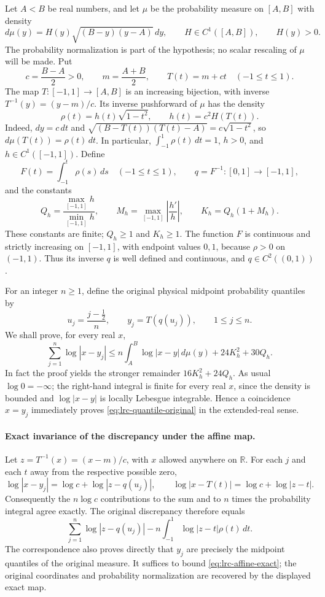 \documentclass[11pt,a4paper]{article}
\begin{document}
Let $A<B$ be real numbers, and let $\mu$ be the probability measure on
$[A,B]$ with density
\[
 d\mu(y)=H(y)\sqrt{(B-y)(y-A)}\,dy,
 \qquad H\in C^1([A,B]),\qquad H(y)>0.
\]
The probability normalization is part of the hypothesis; no scalar
rescaling of $\mu$ will be made. Put
\[
 c=\frac{B-A}{2}>0,\qquad m=\frac{A+B}{2},\qquad
 T(t)=m+ct\quad(-1\leq t\leq1).
\]
The map $T:[-1,1]\longrightarrow[A,B]$ is an increasing bijection,
with inverse $T^{-1}(y)=(y-m)/c$. Its inverse pushforward of $\mu$ has
the density
\[
 \rho(t)=h(t)\sqrt{1-t^2},\qquad h(t)=c^2H(T(t)).
\]
Indeed, $dy=c\,dt$ and
$\sqrt{(B-T(t))(T(t)-A)}=c\sqrt{1-t^2}$, so
$d\mu(T(t))=\rho(t)\,dt$. In particular,
$\int_{-1}^1\rho(t)\,dt=1$, $h>0$, and $h\in C^1([-1,1])$.
Define
\[
 F(t)=\int_{-1}^t\rho(s)\,ds\quad(-1\leq t\leq1),\qquad
 q=F^{-1}:[0,1]\longrightarrow[-1,1],
\]
and the constants
\[
 Q_h=\frac{\max_{[-1,1]}h}{\min_{[-1,1]}h},\qquad
 M_h=\max_{[-1,1]}\left|\frac{h'}h\right|,\qquad
 K_h=Q_h(1+M_h).
\]
These constants are finite; $Q_h\geq1$ and $K_h\geq1$. The function
$F$ is continuous and strictly increasing on $[-1,1]$, with endpoint
values $0,1$, because $\rho>0$ on $(-1,1)$. Thus its inverse $q$ is
well defined and continuous, and $q\in C^2((0,1))$.

For an integer $n\geq1$, define the original physical midpoint
probability quantiles by
\[
 u_j=\frac{j-\tfrac12}{n},\qquad y_j=T(q(u_j)),
 \qquad 1\leq j\leq n.
\]
We shall prove, for every real $x$,
\begin{equation}\label{eq:lrc-quantile-original}
 \sum_{j=1}^n\log|x-y_j|
 \leq n\int_A^B\log|x-y|\,d\mu(y)
       +24K_h^2+30Q_h.
\end{equation}
In fact the proof yields the stronger remainder $16K_h^2+24Q_h$.
As usual $\log0=-\infty$; the right-hand integral is finite for every
real $x$, since the density is bounded and $\log|x-y|$ is locally
Lebesgue integrable. Hence a coincidence $x=y_j$ immediately proves
\eqref{eq:lrc-quantile-original} in the extended-real sense.

\paragraph{Exact invariance of the discrepancy under the affine map.}
Let $z=T^{-1}(x)=(x-m)/c$, with $x$ allowed anywhere on $\mathbb R$.
For each $j$ and each $t$ away from the respective possible zero,
\[
 \log|x-y_j|=\log c+\log|z-q(u_j)|,
 \qquad
 \log|x-T(t)|=\log c+\log|z-t|.
\]
Consequently the $n\log c$ contributions to the sum and to $n$ times
the probability integral agree exactly. The original discrepancy
therefore equals
\begin{equation}\label{eq:lrc-affine-exact}
 \sum_{j=1}^n\log|z-q(u_j)|
   -n\int_{-1}^1\log|z-t|\rho(t)\,dt.
\end{equation}
The correspondence also proves directly that $y_j$ are precisely
the midpoint quantiles of the original measure. It suffices to
bound \eqref{eq:lrc-affine-exact}; the original coordinates and
probability normalization are recovered by the displayed exact map.
\end{document}
